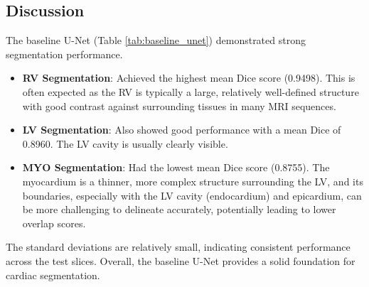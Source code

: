 \documentclass{article}
\begin{document}
\subsection{Discussion}
The baseline U-Net (Table \ref{tab:baseline_unet}) demonstrated strong segmentation performance.
\begin{itemize}
    \item \textbf{RV Segmentation}: Achieved the highest mean Dice score (0.9498). This is often expected as the RV is 
    typically a large, relatively well-defined structure with good contrast against surrounding tissues in many MRI sequences.
    \item \textbf{LV Segmentation}: Also showed good performance with a mean Dice of 0.8960. The LV cavity is usually clearly visible.
    \item \textbf{MYO Segmentation}: Had the lowest mean Dice score (0.8755). The myocardium is a thinner, more complex structure 
    surrounding the LV, and its boundaries, especially with the LV cavity (endocardium) and epicardium, can be more challenging to 
    delineate accurately, potentially leading to lower overlap scores.
\end{itemize}
The standard deviations are relatively small, indicating consistent performance across the test slices. Overall, the baseline U-Net 
provides a solid foundation for cardiac segmentation.














\end{document}
